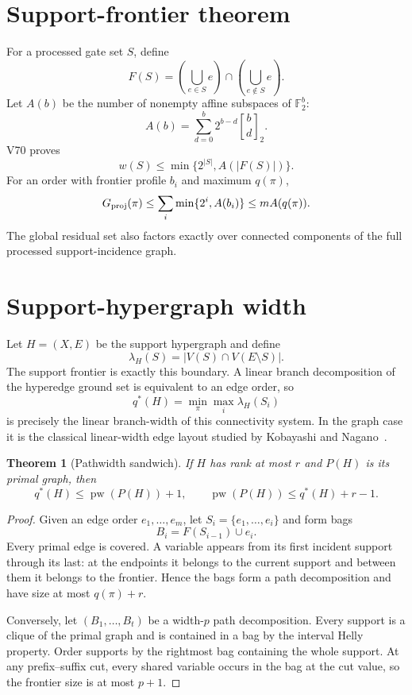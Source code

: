 \documentclass[11pt]{article}
\newtheorem{theorem}{Theorem}[section]
\newcommand{\Ftwo}{\mathbb F_2}
\newcommand{\pw}{\operatorname{pw}}
\begin{document}
\section{Support-frontier theorem}
For a processed gate set $S$, define
\[
F(S)=\left(\bigcup_{e\in S}e\right)\cap
     \left(\bigcup_{e\notin S}e\right).
\]
Let $A(b)$ be the number of nonempty affine subspaces of $\Ftwo^b$:
\[
A(b)=\sum_{d=0}^b 2^{b-d}{b\brack d}_2.
\]
V70 proves
\[
w(S)\le \min\{2^{|S|},A(|F(S)|)\}.
\]
For an order with frontier profile $b_i$ and maximum $q(\pi)$,
\[
G_{\rm proj}(\pi)
\le \sum_i\min\{2^i,A(b_i)\}
\le mA(q(\pi)).
\]
The global residual set also factors exactly over connected components of the full processed support-incidence graph.

\section{Support-hypergraph width}
Let $H=(X,E)$ be the support hypergraph and define
\[
\lambda_H(S)=|V(S)\cap V(E\setminus S)|.
\]
The support frontier is exactly this boundary.  A linear branch decomposition of the hyperedge ground set is equivalent to an edge order, so
\[
q^*(H)=\min_\pi\max_i\lambda_H(S_i)
\]
is precisely the linear branch-width of this connectivity system.  In the graph case it is the classical linear-width edge layout studied by Kobayashi and Nagano~\cite{kobayashi-nagano-linearwidth}.

\begin{theorem}[Pathwidth sandwich]
If $H$ has rank at most $r$ and $P(H)$ is its primal graph, then
\[
q^*(H)\le \pw(P(H))+1,
\qquad
\pw(P(H))\le q^*(H)+r-1.
\]
\end{theorem}

\begin{proof}
Given an edge order $e_1,\ldots,e_m$, let $S_i=\{e_1,\ldots,e_i\}$ and form bags
\[
B_i=F(S_{i-1})\cup e_i.
\]
Every primal edge is covered.  A variable appears from its first incident support through its last: at the endpoints it belongs to the current support and between them it belongs to the frontier.  Hence the bags form a path decomposition and have size at most $q(\pi)+r$.

Conversely, let $(B_1,\ldots,B_t)$ be a width-$p$ path decomposition.  Every support is a clique of the primal graph and is contained in a bag by the interval Helly property.  Order supports by the rightmost bag containing the whole support.  At any prefix--suffix cut, every shared variable occurs in the bag at the cut value, so the frontier size is at most $p+1$.
\end{proof}
\end{document}
